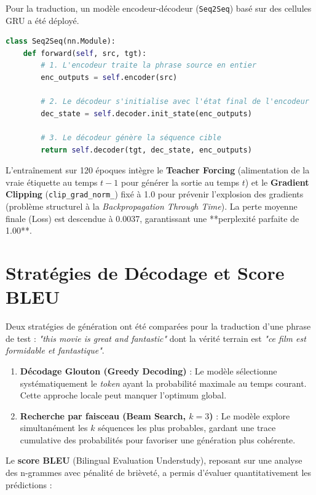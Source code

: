 Pour la traduction, un modèle encodeur-décodeur (\texttt{Seq2Seq}) basé sur des cellules GRU a été déployé. 

\begin{lstlisting}[language=Python, caption=Définition du processus de traduction (Extrait Seq2Seq)]
class Seq2Seq(nn.Module):
    def forward(self, src, tgt):
        # 1. L'encodeur traite la phrase source en entier
        enc_outputs = self.encoder(src)
        
        # 2. Le décodeur s'initialise avec l'état final de l'encodeur
        dec_state = self.decoder.init_state(enc_outputs)
        
        # 3. Le décodeur génère la séquence cible
        return self.decoder(tgt, dec_state, enc_outputs)
\end{lstlisting}

L'entraînement sur 120 époques intègre le \textbf{Teacher Forcing} (alimentation de la vraie étiquette au temps $t-1$ pour générer la sortie au temps $t$) et le \textbf{Gradient Clipping} (\texttt{clip\_grad\_norm\_}) fixé à 1.0 pour prévenir l'explosion des gradients (problème structurel à la \textit{Backpropagation Through Time}). La perte moyenne finale (Loss) est descendue à 0.0037, garantissant une **perplexité parfaite de 1.00**.

\section{Stratégies de Décodage et Score BLEU}

Deux stratégies de génération ont été comparées pour la traduction d'une phrase de test : \textit{"this movie is great and fantastic"} dont la vérité terrain est \textit{"ce film est formidable et fantastique"}.

\begin{enumerate}
    \item \textbf{Décodage Glouton (Greedy Decoding)} : Le modèle sélectionne systématiquement le \textit{token} ayant la probabilité maximale au temps courant. Cette approche locale peut manquer l'optimum global.
    \item \textbf{Recherche par faisceau (Beam Search, $k=3$)} : Le modèle explore simultanément les $k$ séquences les plus probables, gardant une trace cumulative des probabilités pour favoriser une génération plus cohérente.
\end{enumerate}

Le \textbf{score BLEU} (Bilingual Evaluation Understudy), reposant sur une analyse des n-grammes avec pénalité de brièveté, a permis d'évaluer quantitativement les prédictions :

